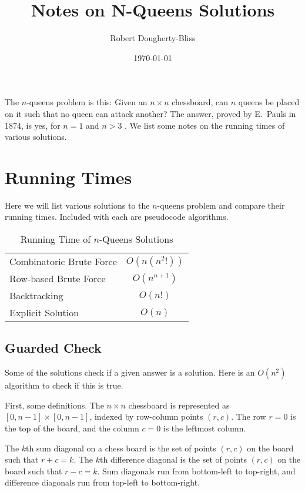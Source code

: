 \documentclass{article}
\begin{document}
\title{Notes on N-Queens Solutions}
\author{Robert Dougherty-Bliss}
\date{\today}
\maketitle

The $n$-queens problem is this: Given an $n \times n$ chessboard, can $n$
queens be placed on it such that no queen can attack another? The answer,
proved by E.~Pauls in 1874, is yes, for $n = 1$ and $n > 3$
\cite{jordanbell07}. We list some notes on the running times of various
solutions.

\section*{Running Times}
\label{sec:running_times}

Here we will list various solutions to the $n$-queens problem and compare their
running times. Included with each are pseudocode algorithms.

\begin{table}[h]
 \caption{Running Time of $n$-Queens Solutions}
 \centering
 \begin{tabular}{lc}
     \hline
     Combinatoric Brute Force & $O(n(n^2!))$ \\
     Row-based Brute Force & $O(n^{n+1})$ \\
     Backtracking & $O(n!)$ \\
     Explicit Solution & $O(n)$ \\
     \hline
 \end{tabular}
\end{table}

\subsection*{Guarded Check}
\label{sub:guarded_check}

Some of the solutions check if a given answer is a solution. Here is an
$O(n^2)$ algorithm to check if this is true.

First, some definitions. The $n \times n$ chessboard is represented as $[0, n-1]
\times [0, n-1]$, indexed by row-column points $(r, c)$. The row $r = 0$ is the
top of the board, and the column $c = 0$ is the leftmost column.

The $k$th sum diagonal on a chess board is the set of points $(r, c)$ on the
board such that $r + c = k$. The $k$th difference diagonal is the set of points
$(r, c)$ on the board such that $r - c = k$. Sum diagonals run from bottom-left
to top-right, and difference diagonals run from top-left to bottom-right.
\end{document}
